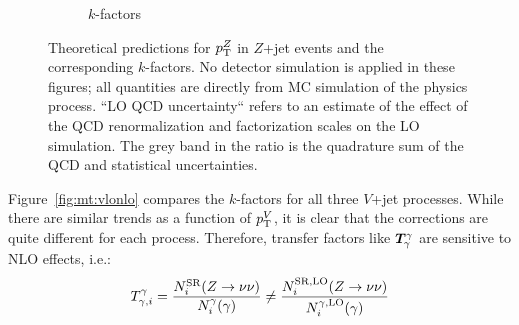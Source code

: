 \begin{figure}[]
\begin{center}
\begin{subfigure}[t]{0.49\textwidth}
            \caption{$k$-factors}
        \end{subfigure}
        \caption{Theoretical predictions for $p_\mathrm{T}^Z$ in $Z$+jet events and the corresponding $k$-factors.
                 No detector simulation is applied in these figures; all quantities are directly from MC simulation of the physics process.
                 ``LO QCD uncertainty`` refers to an estimate of the effect of the QCD renormalization and factorization scales on the LO simulation.
                 The grey band in the ratio is the quadrature sum of the QCD and statistical uncertainties.}
        \label{fig:mt:zlonlo}
    \end{center}
\end{figure}

Figure~\ref{fig:mt:vlonlo} compares the $k$-factors for all three $V$+jet processes.
While there are similar trends as a function of $p_\mathrm{T}^V$, it is clear that the corrections are quite different for each process.
Therefore, transfer factors like $\bm{T}^{\gamma}_{\gamma}$ are sensitive to NLO effects, i.e.:
\begin{equation}
    {T}^{\gamma}_{\gamma,i} = \frac{N^\mathrm{SR}_i(Z\rightarrow\nu\nu)}{N_i^\gamma(\gamma)} \neq \frac{N^\mathrm{SR,LO}_i(Z\rightarrow\nu\nu)}{N_i^{\gamma,\mathrm{LO}}(\gamma)}
\end{equation}

